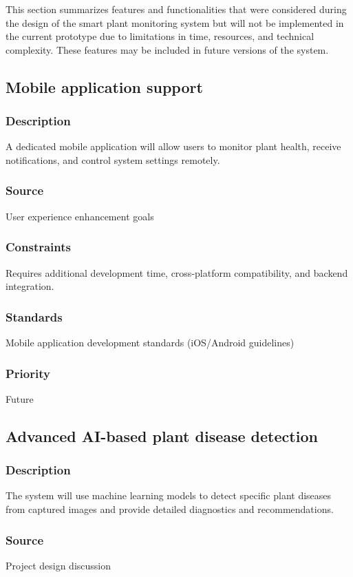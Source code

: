 This section summarizes features and functionalities that were considered during the design of the smart plant monitoring system but will not be implemented in the current prototype due to limitations in time, resources, and technical complexity. These features may be included in future versions of the system.


\subsection{Mobile application support}
\subsubsection{Description}
A dedicated mobile application will allow users to monitor plant health, receive notifications, and control system settings remotely.
\subsubsection{Source}
User experience enhancement goals
\subsubsection{Constraints}
Requires additional development time, cross-platform compatibility, and backend integration.
\subsubsection{Standards}
Mobile application development standards (iOS/Android guidelines)
\subsubsection{Priority}
Future

\subsection{Advanced AI-based plant disease detection}
\subsubsection{Description}
The system will use machine learning models to detect specific plant diseases from captured images and provide detailed diagnostics and recommendations.
\subsubsection{Source}
Project design discussion
